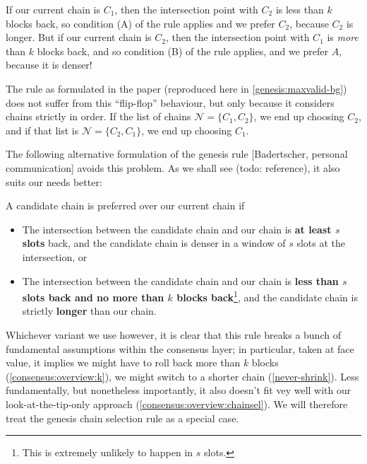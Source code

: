 If our current chain is $C_1$, then the intersection point with $C_2$ is less
than $k$ blocks back, so condition (A) of the rule applies and we prefer $C_2$,
because $C_2$ is longer. But if our current chain is $C_2$, then the
intersection point with $C_1$ is \emph{more} than $k$ blocks back, and so
condition (B) of the rule applies, and we prefer $A$, because it is denser!

The rule as formulated in the paper (reproduced here in
\cref{genesis:maxvalid-bg}) does not suffer from this ``flip-flop'' behaviour,
but only because it considers chains strictly in order. If the list of chains
$\mathcal{N} = \{ C_1, C_2 \}$, we end up choosing $C_2$, and if that list is
$\mathcal{N} = \{ C_2, C_1 \}$, we end up choosing $C_1$.

The following alternative formulation of the genesis rule [Badertscher, personal
communication] avoids this problem. As we shall see (todo:
reference), it also suits our needs better:

\pagebreak

\begin{definition}
\label{genesis:originalrule}
A candidate chain is preferred over our current chain if

\begin{itemize}
\item The intersection between the candidate chain and our chain is
\textbf{at least $s$ slots} back, and the candidate chain is denser in a window
of $s$ slots at the intersection, or

\item The intersection between the candidate chain and our chain is \textbf{less
than $s$ slots back and no more than $k$ blocks back}\footnote{This is
extremely unlikely to happen in $s$ slots.}, and the candidate chain is strictly
\textbf{longer} than our chain.
\end{itemize}

\end{definition}

Whichever variant we use however, it is clear that this rule breaks a bunch of
fundamental assumptions within the consensus layer; in particular, taken at face
value, it implies we might have to roll back more than $k$ blocks
(\cref{consensus:overview:k}), we might switch to a shorter chain
(\cref{never-shrink}). Less fundamentally, but nonetheless importantly, it also
doesn't fit vey well with our look-at-the-tip-only approach
(\cref{consensus:overview:chainsel}). We will therefore treat the genesis
chain selection rule as a special case.

